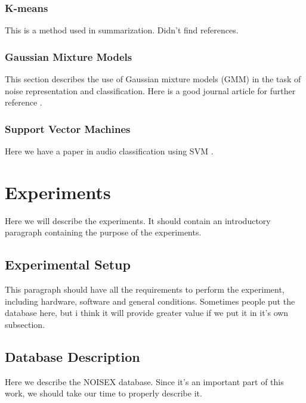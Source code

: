 \documentclass[12pt]{article}
\begin{document}
\subsubsection{K-means} \label{class:kmeans}

This is a method used in summarization. Didn't find references.

\subsubsection{Gaussian Mixture Models} \label{class:gmm}

This section describes the use of Gaussian mixture models (GMM) in the task of noise representation and classification. Here is a good journal article for further reference \cite{reynolds1995robust}.


\subsubsection{Support Vector Machines} \label{class:svm}

Here we have a paper in audio classification using SVM \cite{cumani2012analysis}.



\section{Experiments} \label{exp}

Here we will describe the experiments. It should contain an introductory paragraph containing the purpose of the experiments.

\subsection{Experimental Setup} \label{exp:setup}

This paragraph should have all the requirements to perform the experiment, including hardware, software and general conditions. Sometimes people put the database here, but i think it will provide greater value if we put it in it's own subsection.

\subsection{Database Description} \label{exp:data}

Here we describe the NOISEX database. Since it's an important part of this work, we should take our time to properly describe it.
\end{document}
